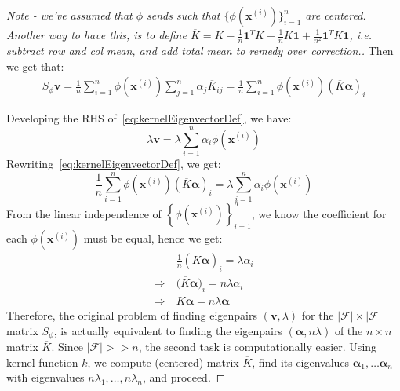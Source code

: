 \documentclass{article}
\begin{document}
\begin{theorem}
\begin{proof}
[Note - we've assumed that $\phi$ sends such that $\{  \phi(\bm{x}^{(i)}) \}_{i=1}^{n}$ are centered. Another way to have this, is to define $\overline{K} = K - \frac{1}{n}\bm{1}^{T} K - \frac{1}{n}K\bm{1} + \frac{1}{n^2} \bm{1}^{T} K \bm{1}$, i.e. subtract row and col mean, and add total mean to remedy over correction.] 

Then we get that:
\begin{align*}
  S_{\phi} \bm{v} = \frac{1}{n} \sum_{i=1}^{n} \phi (\bm{x}^{(i)}) \sum_{j=1}^{n} \alpha_{j} \overline{K}_{ij} = \frac{1}{n} \sum_{i=1}^{n} \phi(\bm{x}^{(i)}) (\overline{K} \bm{\alpha})_{i}
\end{align*}

Developing the RHS of~\cref{eq:kernelEigenvectorDef}, we have:
\[
  \lambda \bm{v} = \lambda \sum_{i=1}^{n} \alpha_i \phi(\bm{x}^{(i)})
\]
Rewriting~\cref{eq:kernelEigenvectorDef}, we get:
\[
   \frac{1}{n} \sum_{i=1}^{n} \phi(\bm{x}^{(i)}) (\overline{K} \bm{\alpha})_{i}
= \lambda \sum_{i=1}^{n} \alpha_i \phi(\bm{x}^{(i)})
\]
From the linear independence of $\left\{ \phi(\bm{x}^{(i)}) \right\}_{i=1}^{n}$, we know the coefficient for each $\phi(\bm{x}^{(i)})$ must be equal, hence we get:
\begin{align*}
  &  \frac{1}{n} (\overline{K} \bm{\alpha})_i = \lambda \alpha_i \\
  \Rightarrow \ & \big( \overline{K} \bm{\alpha} \big)_i = n \lambda \alpha_i \\
  \Rightarrow \ & K \bm{\alpha} = n \lambda \bm{\alpha}
\end{align*}
  Therefore, the original problem of finding eigenpairs $(\bm{v}, \lambda)$ for the $|\mathcal{F}| \times |\mathcal{F}|$ matrix $S_{\phi}$, is actually equivalent to finding the eigenpairs $(\bm{\alpha}, n \lambda)$ of the $n \times n$ matrix  $\overline{K}$. Since $|\mathcal{F}| >> n$, the second task is computationally easier. Using kernel function $k$, we compute (centered) matrix $\overline{K}$, find its eigenvalues $\bm{\alpha}_1, \ldots \bm{\alpha}_{n}$ with eigenvalues $n \lambda_1, \ldots, n \lambda_{n}$, and proceed. 
\end{proof}
\end{theorem}
\end{document}
